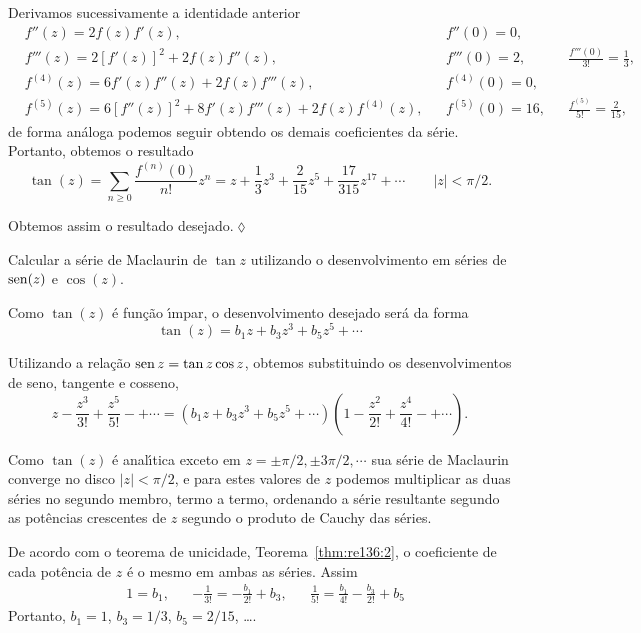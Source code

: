 Derivamos sucessivamente a identidade
anterior
\begin{align*}
&f''(z)=2f(z)f'(z), && f''(0)=0, && \\[2ex]
&f'''(z)=2[f'(z)]^2+2f(z)f''(z), && f'''(0)=2,&& \frac{f'''(0)}{3!}=\frac{1}{3},\\[2ex]
&f^{(4)}(z)=6f'(z)f''(z)+2f(z)f'''(z), &&f^{(4)}(0)=0, &&\\[2ex]
&f^{(5)}(z)=6[f''(z)]^2+8f'(z)f'''(z)+2f(z)f^{(4)}(z), &&f^{(5)}(0)=16, &&\frac{f^{(5)}}{5!}=\frac{2}{15},
\end{align*}
de forma an\'{a}loga podemos seguir obtendo os demais coeficientes da
s\'{e}rie. Portanto, obtemos o resultado
\begin{equation}\label{pra143:3}
\tan(z) = \sum_{n\ge 0}\frac{f^{(n)}(0)}{n!}z^n=z + \frac{1}{3}z^3 + \frac{2}{15} z^5 +
\frac{17}{315}z^{17} +\cdots \qquad |z|<\pi/2.
\end{equation}

Obtemos assim o resultado desejado.\hfill \(\lozenge\)

\begin{exer}
Calcular a s\'{e}rie de Maclaurin de $\tan z$ utilizando o desenvolvimento em s\'{e}ries de
$\operatorname{sen}(z)$ e $\cos(z)$.
\end{exer}

\solo Como $\tan(z)$ \'{e} fun\c{c}\~{a}o \'{\i}mpar, o desenvolvimento desejado ser\'{a} da
forma
\begin{equation*}
\tan(z) = b_1z + b_3z^3 + b_5z^5 +\cdots
\end{equation*}

Utilizando a rela\c{c}\~{a}o $\operatorname{sen} z =\tan z \cos z$, obtemos substituindo os
desenvolvimentos de seno, tangente e cosseno,
\begin{equation*}
  z - \frac{z^3}{3!} + \frac{z^5}{5!}- +\cdots= (b_1z + b_3z^3 + b_5z^5
  +\cdots)\left(1-\frac{z^2}{2!} + \frac{z^4}{4!}- +\cdots
  \right).
\end{equation*}

Como $\tan(z)$ \'{e} anal\'{\i}tica exceto em $z =\pm \pi/2,\pm
3\pi/2,\cdots$ sua s\'{e}rie de Maclaurin converge no disco $|z|
<\pi/2$, e para estes valores de $z$ podemos multiplicar as duas
s\'{e}ries no segundo membro, termo a termo, ordenando a s\'{e}rie
resultante segundo as pot\^{e}ncias crescentes de $z$ segundo o
produto de Cauchy das s\'{e}ries.

De acordo com o teorema de unicidade, Teorema~\ref{thm:re136:2}, o coeficiente de
cada pot\^{e}ncia de $z$ \'{e} o
mesmo em ambas as s\'{e}ries. Assim
\begin{align*}
&1= b_1, && -\frac{1}{3!}=-\frac{b_1}{2!}+ b_3,&& \frac{1}{5!} = \frac{b_1}{4!}- \frac{b_3}{2!}+ b_5
\end{align*}
Portanto, $b_1 = 1$, $b_3=1/3$, $b_5=2/15$,\; \ldots.

